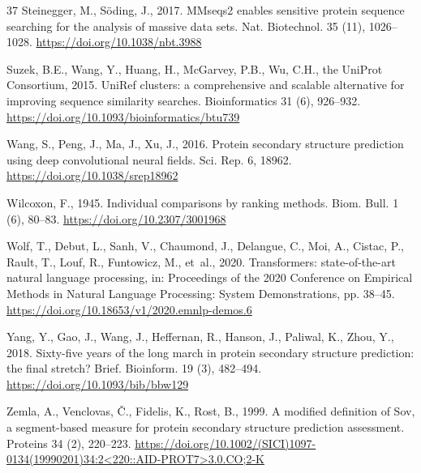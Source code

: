 \documentclass[preprint,12pt,authoryear]{elsarticle}
\begin{document}
\begin{thebibliography}{37}
Steinegger, M., S{\"o}ding, J., 2017. MMseqs2 enables sensitive protein sequence searching for the analysis of massive data sets. Nat. Biotechnol. 35 (11), 1026--1028. \url{https://doi.org/10.1038/nbt.3988}

Suzek, B.E., Wang, Y., Huang, H., McGarvey, P.B., Wu, C.H., the UniProt Consortium, 2015. UniRef clusters: a comprehensive and scalable alternative for improving sequence similarity searches. Bioinformatics 31 (6), 926--932. \url{https://doi.org/10.1093/bioinformatics/btu739}

Wang, S., Peng, J., Ma, J., Xu, J., 2016. Protein secondary structure prediction using deep convolutional neural fields. Sci. Rep. 6, 18962. \url{https://doi.org/10.1038/srep18962}

Wilcoxon, F., 1945. Individual comparisons by ranking methods. Biom. Bull. 1 (6), 80--83. \url{https://doi.org/10.2307/3001968}

Wolf, T., Debut, L., Sanh, V., Chaumond, J., Delangue, C., Moi, A., Cistac, P., Rault, T., Louf, R., Funtowicz, M., et~al., 2020. Transformers: state-of-the-art natural language processing, in: Proceedings of the 2020 Conference on Empirical Methods in Natural Language Processing: System Demonstrations, pp. 38--45. \url{https://doi.org/10.18653/v1/2020.emnlp-demos.6}

Yang, Y., Gao, J., Wang, J., Heffernan, R., Hanson, J., Paliwal, K., Zhou, Y., 2018. Sixty-five years of the long march in protein secondary structure prediction: the final stretch? Brief. Bioinform. 19 (3), 482--494. \url{https://doi.org/10.1093/bib/bbw129}

Zemla, A., Venclovas, {\v{C}}., Fidelis, K., Rost, B., 1999. A modified definition of Sov, a segment-based measure for protein secondary structure prediction assessment. Proteins 34 (2), 220--223. \url{https://doi.org/10.1002/(SICI)1097-0134(19990201)34:2<220::AID-PROT7>3.0.CO;2-K}

\end{thebibliography}
\end{document}
